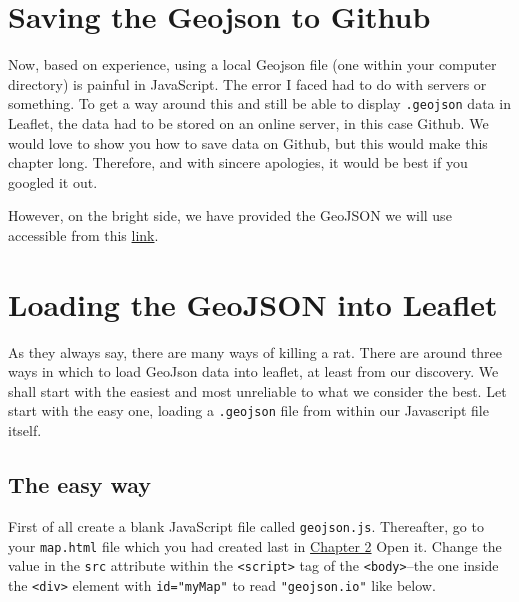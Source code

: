 \documentclass[
]{book}
\begin{document}
\hypertarget{saving-the-geojson-to-github}{%
\section{Saving the Geojson to Github}\label{saving-the-geojson-to-github}}

Now, based on experience, using a local Geojson file (one within your computer directory) is painful in JavaScript. The error I faced had to do with servers or something. To get a way around this and still be able to display \texttt{.geojson} data in Leaflet, the data had to be stored on an online server, in this case Github. We would love to show you how to save data on Github, but this would make this chapter long. Therefore, and with sincere apologies, it would be best if you googled it out.

However, on the bright side, we have provided the GeoJSON we will use accessible from this \href{https://raw.githubusercontent.com/sammigachuhi/geojson_files/main/cities-geojson.geojson}{link}.

\hypertarget{loading-the-geojson-into-leaflet}{%
\section{Loading the GeoJSON into Leaflet}\label{loading-the-geojson-into-leaflet}}

As they always say, there are many ways of killing a rat. There are around three ways in which to load GeoJson data into leaflet, at least from our discovery. We shall start with the easiest and most unreliable to what we consider the best. Let start with the easy one, loading a \texttt{.geojson} file from within our Javascript file itself.

\hypertarget{the-easy-way}{%
\subsection{The easy way}\label{the-easy-way}}

First of all create a blank JavaScript file called \texttt{geojson.js}. Thereafter, go to your \texttt{map.html} file which you had created last in \protect\hyperlink{setting-the-superstructure}{Chapter 2} Open it. Change the value in the \texttt{src} attribute within the \texttt{\textless{}script\textgreater{}} tag of the \texttt{\textless{}body\textgreater{}}--the one inside the \texttt{\textless{}div\textgreater{}} element with \texttt{id="myMap"} to read \texttt{"geojson.io"} like below.
\end{document}
